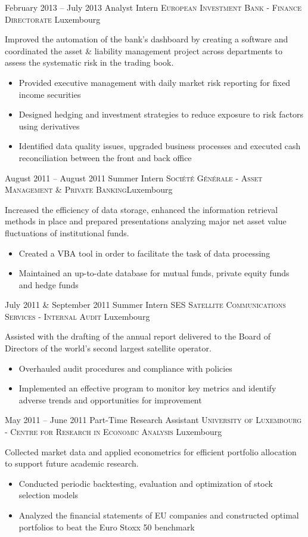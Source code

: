 \documentclass[11pt,a4paper,sans]{moderncv}
\begin{document}
\cventry
	{February 2013 -- July 2013}
	{Analyst Intern}
	{\textsc{European Investment Bank - Finance Directorate}}
	{Luxembourg}{}
	{
	Improved the automation of the bank's dashboard by creating a software and coordinated the asset \& liability management project across departments to assess the systematic risk in the trading book.
	\vspace{1mm}
	\begin{itemize}
		\item Provided executive management with daily market risk reporting for fixed income securities
		\item Designed hedging and investment strategies to reduce exposure to risk factors using derivatives
		\item Identified data quality issues, upgraded business processes and executed cash reconciliation between the front and back office
		\vspace{2mm}
	\end{itemize}
	}
\cventry
	{August 2011 -- August 2011}
	{Summer Intern}
	{\textsc{Société Générale - Asset Management \& Private Banking}}{Luxembourg}{}
	{
	Increased the efficiency of data storage, enhanced the information retrieval methods in place and prepared presentations analyzing major net asset value fluctuations of institutional funds.
	\vspace{1mm}
	\begin{itemize}
		\item Created a VBA tool in order to facilitate the task of data processing 
		\item Maintained an up-to-date database for mutual funds, private equity funds and hedge funds
		\vspace{2mm}
	\end{itemize}
	}
\cventry
	{July 2011 \& September 2011 }
	{Summer Intern}
	{\textsc{SES Satellite Communications Services - Internal Audit}}
	{Luxembourg}{}
	{
	Assisted with the drafting of the annual report delivered to the Board of Directors of the world's second largest satellite operator.\vspace{1mm}
	\begin{itemize}
		\item Overhauled audit procedures and compliance with policies
		\item Implemented an effective program to monitor key metrics and identify adverse trends and opportunities for improvement
		\vspace{2mm}
	\end{itemize}
	}
\cventry
	{May 2011 -- June 2011}
	{Part-Time Research Assistant}
	{\textsc{University of Luxembourg - Centre for Research in Economic Analysis}}
	{Luxembourg}{}
	{
	Collected market data and applied econometrics for efficient portfolio allocation to support future academic research.
	\vspace{1mm}
	\begin{itemize}
		\item Conducted periodic backtesting, evaluation and optimization of stock selection models
		\item Analyzed the financial statements of EU companies and constructed optimal portfolios to beat the Euro Stoxx 50 benchmark
	\end{itemize}
	}
\end{document}
